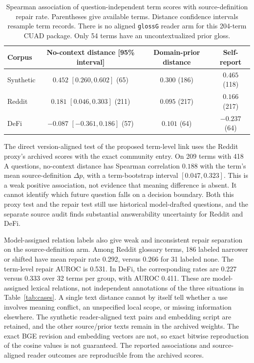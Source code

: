 \begin{table}[h]\centering\small
\caption{Spearman association of question-independent term scores with source-definition repair rate. Parentheses give available terms. Distance confidence intervals resample term records. There is no aligned \texttt{glossG} reader arm for this 204-term CUAD package. Only 54 terms have an uncontextualized prior gloss.}
\label{tab:term-difference-repair}
\begin{tabular}{@{}lccc@{}}\toprule
Corpus & No-context distance [95\% interval] & Domain-prior distance & Self-report\\\midrule
Synthetic & $0.452$ $[0.260,0.602]$ (65) & $0.300$ (186) & $0.465$ (118)\\
Reddit & $0.181$ $[0.046,0.303]$ (211) & $0.095$ (217) & $0.166$ (217)\\
DeFi & $-0.087$ $[-0.361,0.186]$ (57) & $0.101$ (64) & $-0.237$ (64)\\\bottomrule
\end{tabular}
\end{table}

The direct version-aligned test of the proposed term-level link uses the Reddit proxy's archived scores with the exact community entry. On 209 terms with 418 A questions, no-context distance has Spearman correlation $0.188$ with the term's mean source-definition $\Delta p$, with a term-bootstrap interval $[0.047,0.323]$. This is a weak positive association, not evidence that meaning difference is absent. It cannot identify which future question falls on a decision boundary. Both this proxy test and the repair test still use historical model-drafted questions, and the separate source audit finds substantial answerability uncertainty for Reddit and DeFi.

Model-assigned relation labels also give weak and inconsistent repair separation on the source-definition arm. Among Reddit glossary terms, 186 labeled narrower or shifted have mean repair rate 0.292, versus 0.266 for 31 labeled none. The term-level repair AUROC is 0.531. In DeFi, the corresponding rates are 0.227 versus 0.333 over 32 terms per group, with AUROC 0.411. These are model-assigned lexical relations, not independent annotations of the three situations in Table~\ref{tab:cases}. A single text distance cannot by itself tell whether a use involves meaning conflict, an unspecified local scope, or missing information elsewhere. The synthetic reader-aligned text pairs and embedding script are retained, and the other source/prior texts remain in the archived weights. The exact BGE revision and embedding vectors are not, so exact bitwise reproduction of the cosine values is not guaranteed. The reported associations and source-aligned reader outcomes are reproducible from the archived scores.
